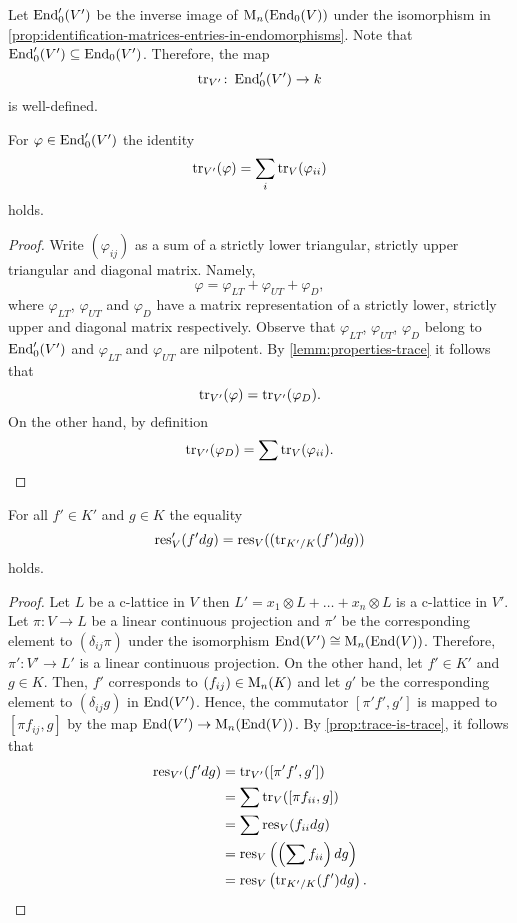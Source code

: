 Let $\operatorname{End}'_{0}(V')$ be the inverse image of $\operatorname{M}_{n}(\operatorname{End}_{0}(V))$ under the isomorphism in \cref{prop:identification-matrices-entries-in-endomorphisms}. Note that $\operatorname{End}'_{0}(V')\subseteq \operatorname{End}_{0}(V')$. Therefore, the map
\[
	\operatorname{tr}_{V'}\colon \operatorname{End}'_{0}(V') \to k
\]
is well-defined. 
\begin{proposition}\label{prop:trace-is-trace}
	For $\varphi \in \operatorname{End}'_{0}(V')$ the identity
	\[
		\operatorname{tr}_{V'}(\varphi) = \sum_{i}\operatorname{tr}_{V}(\varphi_{ii})
	\]
	holds.
\end{proposition}
\begin{proof}
	Write $(\varphi_{ij})$ as a sum of a strictly lower triangular,  strictly upper triangular and diagonal matrix. Namely,
	\[
		\varphi = \varphi_{LT} + \varphi_{UT} + \varphi_{D}, 
	\]
	where $\varphi_{LT}$, $\varphi_{UT}$ and $\varphi_{D}$  have a matrix representation of a strictly lower, strictly upper and diagonal matrix respectively. Observe that $\varphi_{LT}$, $\varphi_{UT}$, $\varphi_{D}$ belong to $\operatorname{End}'_{0}(V')$ and $\varphi_{LT}$ and $\varphi_{UT}$ are nilpotent. By \cref{lemm:properties-trace} it follows that
	\[
		\operatorname{tr}_{V'}(\varphi) = \operatorname{tr}_{V'}(\varphi_{D}).
	\]
	On the other hand, by definition
	\[
		\operatorname{tr}_{V'}(\varphi_{D}) = \sum \operatorname{tr}_{V}(\varphi_{ii}).
	\]
\end{proof}


\begin{theorem}\label{thm:residue-of-finite-rank}
	For all $f' \in K'$ and $g \in K$ the equality
	\[
		\operatorname{res}_{V}'(f' dg) = \operatorname{res}_{V}((\operatorname{tr}_{K'/K}(f')dg))
	\]
	holds.
\end{theorem}
\begin{proof}
	Let $L$ be a c-lattice in $V$ then $L' = x_{1} \otimes L + \ldots + x_{n} \otimes L$ is a c-lattice in $V'$. Let $\pi\colon V\to L$ be a linear continuous projection and $\pi'$ be the corresponding element to $(\delta_{ij}\pi)$ under the isomorphism $\operatorname{End}(V') \cong \operatorname{M}_{n}(\operatorname{End}(V))$. Therefore, $\pi'\colon V' \to L'$ is a linear continuous projection. On the other hand, let $f'\in K'$ and $g\in K$. Then, $f'$ corresponds to $(f_{ij})\in \operatorname{M}_{n}(K)$ and let $g'$ be the corresponding element to $(\delta_{ij} g)$ in $\operatorname{End}(V')$. Hence, the commutator $[\pi'f', g']$ is mapped to $[\pi f_{ij}, g]$ by the map $\operatorname{End}(V') \to \operatorname{M}_{n}(\operatorname{End}(V))$. By \cref{prop:trace-is-trace}, it follows that
	\begin{align*}
		\operatorname{res}_{V'}(f' dg) &= \operatorname{tr}_{V'}([\pi'f', g'])  \\
		&= \sum \operatorname{tr}_{V}([\pi f_{ii}, g]) \\
		&= \sum \operatorname{res}_{V}(f_{ii} dg) \\
		&= \operatorname{res}_{V}\left(\left(\sum f_{ii}\right)dg\right) \\
		&= \operatorname{res}_{V}\left(\operatorname{tr}_{K'/K}(f')dg\right).
	\end{align*}
\end{proof}

